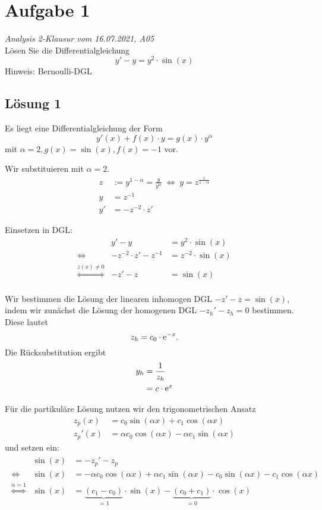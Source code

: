 \documentclass[main.tex]{subfiles}
\begin{document}
\section{Aufgabe 1}
\textit{Analysis 2-Klausur vom 16.07.2021, A05}\\
Lösen Sie die Differentialgleichung
\begin{equation*}
	y' - y = y^2 \cdot \sin(x)
\end{equation*}
Hinweis: Bernoulli-DGL

\subsection{Lösung 1}
Es liegt eine Differentialgleichung der Form
$$
	y'(x) + f(x)\cdot y = g(x)\cdot y^\alpha
$$
mit $\alpha = 2, g(x) = \sin(x), f(x) = -1$ vor. 

Wir substituieren mit $\alpha = 2$.
\begin{align*}
	z &:= y^{1-\alpha} = \frac{y}{y^\alpha} \;\Leftrightarrow\; y=z^{\frac{1}{1-\alpha}}\\[4mm]
	y  &= z^{-1} \\
	y' &= -z^{-2}\cdot z'
\end{align*}

Einsetzen in DGL:
\begin{equation*}
\begin{array}{crl}
				& y' - y &= y^2 \cdot \sin(x) \\[2mm]
\Leftrightarrow	& -z^{-2}\cdot z' - z^{-1} &= z^{-2}\cdot \sin(x) \\
\overset{z(x) \neq 0}{\Leftrightarrow}	& -z' - z &= \sin(x)\\
\end{array}
\end{equation*}

Wir bestimmen die Lösung der linearen inhomogen DGL $-z' - z = \sin(x)$, indem wir zunächst die Lösung der homogenen DGL $-z_h' - z_h = 0$ bestimmen.
Diese lautet
$$
	z_h = c_0 \cdot \mathrm{e}^{-x}. 
$$
Die Rücksubstitution ergibt
\begin{align*}
	y_h &= \frac{1}{z_h} \\
	    &= c \cdot \mathrm{e}^{x}
\end{align*}

Für die partikuläre Lösung nutzen wir den trigonometrischen Ansatz
\begin{align*}
    z_p(x)   &= c_0 \sin(\alpha x) + c_1 \cos(\alpha x) \\
    z_p'(x)  &= \alpha c_0 \cos(\alpha x) - \alpha c_1 \sin(\alpha x)
\end{align*}
und setzen ein:
\begin{align*}
\begin{array}{crl}
				& \sin(x) &= -z_p' - z_p \\
\Leftrightarrow & \sin(x) &= - \alpha c_0 \cos(\alpha x) + \alpha c_1 \sin(\alpha x)
							 - c_0 \sin(\alpha x) - c_1 \cos(\alpha x) \\
\overset{\alpha = 1}{\Leftrightarrow} & \sin(x) &=
					  \underbrace{(c_1 - c_0)}_{= 1}\cdot \sin(x)
					- \underbrace{(c_0 + c_1)}_{= 0}\cdot \cos(x) \\
\end{array}
\end{align*}
\end{document}
